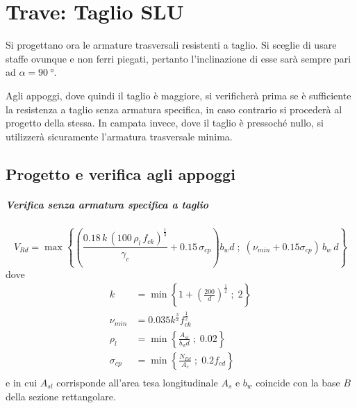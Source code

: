 \chapter{Trave: Taglio SLU}
Si progettano ora le armature trasversali resistenti a taglio. 
Si sceglie di usare staffe ovunque e non ferri piegati, pertanto l'inclinazione di esse sarà sempre pari ad $\alpha = \SI{90}{\degree}$.

Agli appoggi, dove quindi il taglio è maggiore, si verificherà prima se è sufficiente la resistenza a taglio senza armatura specifica, in caso contrario si procederà al progetto della stessa.
In campata invece, dove il taglio è pressoché nullo, si utilizzerà sicuramente l'armatura trasversale minima.

\section{Progetto e verifica agli appoggi}
\paragraph{Verifica senza armatura specifica a taglio}
\begin{equation}
    V_{Rd} = \max \left\{ \left(\frac{0.18 \, k \, (100 \, \rho_l \, f_{ck})^{\tfrac{1}{3}}}{\gamma_c} + 0.15 \, \sigma _{cp}\right) b_w d \; ; \;(\nu_{min} + 0.15\sigma _{cp}) \, b_w \, d \right\}
\end{equation}
dove 
\[
    \begin{split}
        k &= \min \left\{ 1 + \left(\frac{200}{d}\right)^ {\tfrac{1}{2}} \; ; \; 2\right\} \\
        \nu_{min} &= 0.035 k ^ \frac{3}{2} f_{ck}^ \frac{1}{2} \\
        \rho_l &= \min \left\{ \frac{A_{sl}}{b_w d} \; ; \; 0.02\right\} \\
        \sigma_{cp} &= \min \left\{ \frac{N_{Ed}}{A_c} \; ; \; 0.2 f_{cd} \right\} \\
    \end{split}
\]
e in cui $A_{sl}$ corrisponde all'area tesa longitudinale $A_s$ e $b_w$ coincide con la base $B$ della sezione rettangolare.

